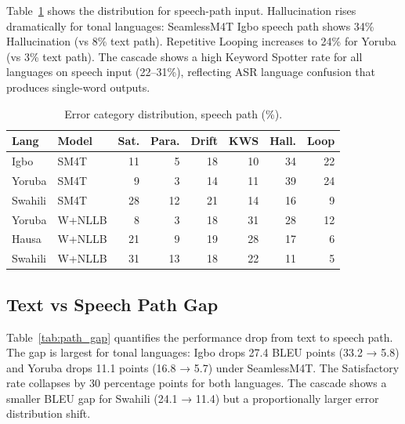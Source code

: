 \documentclass[11pt,a4paper]{article}
\begin{document}
Table~\ref{tab:speech_path_errors} shows the distribution for speech-path input. Hallucination rises dramatically for tonal languages: SeamlessM4T Igbo speech path shows 34\% Hallucination (vs 8\% text path). Repetitive Looping increases to 24\% for Yoruba (vs 3\% text path). The cascade shows a high Keyword Spotter rate for all languages on speech input (22–31\%), reflecting ASR language confusion that produces single-word outputs.

\begin{table}[t]
\centering
\small
\setlength{\tabcolsep}{3pt}
\caption{Error category distribution, speech path (\%).}
\label{tab:speech_path_errors}
\begin{tabular}{llrrrrrr}
\toprule
\textbf{Lang} & \textbf{Model} & \textbf{Sat.} & \textbf{Para.} & \textbf{Drift} & \textbf{KWS} & \textbf{Hall.} & \textbf{Loop} \\
\midrule
Igbo   & SM4T    & 11 &  5 & 18 & 10 & 34 & 22 \\
Yoruba & SM4T    &  9 &  3 & 14 & 11 & 39 & 24 \\
Swahili& SM4T    & 28 & 12 & 21 & 14 & 16 &  9 \\
Yoruba & W+NLLB  &  8 &  3 & 18 & 31 & 28 & 12 \\
Hausa  & W+NLLB  & 21 &  9 & 19 & 28 & 17 &  6 \\
Swahili& W+NLLB  & 31 & 13 & 18 & 22 & 11 &  5 \\
\bottomrule
\end{tabular}
\end{table}

\subsection{Text vs Speech Path Gap}

Table~\ref{tab:path_gap} quantifies the performance drop from text to speech path. The gap is largest for tonal languages: Igbo drops 27.4 BLEU points (33.2 → 5.8) and Yoruba drops 11.1 points (16.8 → 5.7) under SeamlessM4T. The Satisfactory rate collapses by 30 percentage points for both languages. The cascade shows a smaller BLEU gap for Swahili (24.1 → 11.4) but a proportionally larger error distribution shift.
\end{document}
